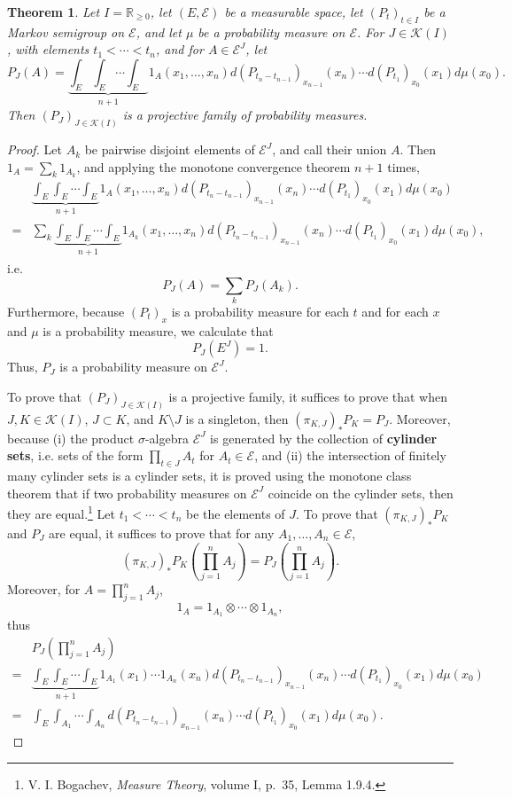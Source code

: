 \documentclass{article}
\newtheorem{theorem}{Theorem}
\theoremstyle{definition}
\begin{document}
\begin{theorem}
Let $I=\mathbb{R}_{\geq 0}$,
let $(E,\mathscr{E})$ be a measurable space, let $(P_t)_{t \in I}$ be a Markov semigroup 
on $\mathscr{E}$, and let $\mu$ be a probability measure on $\mathscr{E}$. For 
$J \in \mathscr{K}(I)$, with elements $t_1<\cdots<t_n$, and for $A \in \mathscr{E}^J$,
let
\[
P_J(A) = \underbrace{\int_E \int_E \cdots \int_E}_{n+1} 1_A(x_1,\ldots,x_n) d(P_{t_n-t_{n-1}})_{x_{n-1}}(x_n)
\cdots d(P_{t_1})_{x_0}(x_1) d\mu(x_0).
\]
Then $(P_J)_{J \in \mathscr{K}(I)}$ is a projective family of probability measures.
\label{projective}
\end{theorem}
\begin{proof}
Let $A_k$ be pairwise disjoint elements of $\mathscr{E}^J$, and call their union $A$. 
Then $1_A = \sum_k 1_{A_k}$,
and applying the monotone convergence theorem $n+1$ times,
\[
\begin{split}
& \underbrace{\int_E \int_E \cdots \int_E}_{n+1} 1_A(x_1,\ldots,x_n) d(P_{t_n-t_{n-1}})_{x_{n-1}}(x_n)
\cdots d(P_{t_1})_{x_0}(x_1) d\mu(x_0)\\
=&\sum_k  \underbrace{\int_E \int_E \cdots \int_E}_{n+1}  1_{A_k}(x_1,\ldots,x_n) d(P_{t_n-t_{n-1}})_{x_{n-1}}(x_n)
\cdots d(P_{t_1})_{x_0}(x_1) d\mu(x_0),
\end{split}
\]
i.e.
\[
P_J(A) = \sum_k P_J(A_k).
\]
Furthermore, because $(P_t)_x$ is a probability measure for each $t$ and for each $x$ and $\mu$ is a probability measure, we calculate that
\[
P_J(E^J) = 1.
\]
Thus, $P_J$ is a probability measure on $\mathscr{E}^J$. 

To prove that $(P_J)_{J \in \mathscr{K}(I)}$ is a projective family, it suffices to prove that when $J,K \in \mathscr{K}(I)$,
$J \subset K$, and $K \setminus J$ is a singleton, then $(\pi_{K,J})_* P_K = P_J$. Moreover, 
because (i) the product $\sigma$-algebra $\mathscr{E}^J$ is generated by the collection of \textbf{cylinder sets}, i.e. sets
of the form $\prod_{t \in J} A_t$ for $A_t \in \mathscr{E}$, and (ii)  the intersection of finitely many cylinder sets is a cylinder sets,
it is proved using  the monotone class theorem that if two probability measures on $\mathscr{E}^J$  coincide on the cylinder
sets, then they are equal.\footnote{V. I. Bogachev, {\em Measure Theory}, volume I, p.~35, Lemma 1.9.4.}
Let $t_1<\cdots<t_n$ be the elements of $J$. To prove that 
$(\pi_{K,J})_* P_K$ and
$P_J$ are equal, it suffices to prove that
for any $A_1,\ldots,A_n \in \mathscr{E}$,
\[
(\pi_{K,J})_* P_K\left(\prod_{j=1}^n A_j\right) = P_J\left(\prod_{j=1}^n A_j\right).
\]
Moreover, for $A=\prod_{j=1}^n A_j$,
\[
1_A = 1_{A_1} \otimes \cdots \otimes 1_{A_n}, 
\]
thus
\[
\begin{split}
&P_J\left(\prod_{j=1}^n A_j\right)\\
=& \underbrace{\int_E \int_E \cdots \int_E}_{n+1} 1_{A_1}(x_1)\cdots 1_{A_n}(x_n) d(P_{t_n-t_{n-1}})_{x_{n-1}}(x_n)
\cdots d(P_{t_1})_{x_0}(x_1) d\mu(x_0)\\
=&\int_E \int_{A_1} \cdots \int_{A_n}
d(P_{t_n-t_{n-1}})_{x_{n-1}}(x_n)
\cdots d(P_{t_1})_{x_0}(x_1) d\mu(x_0).
\end{split}
\]


\end{proof}
\end{document}

